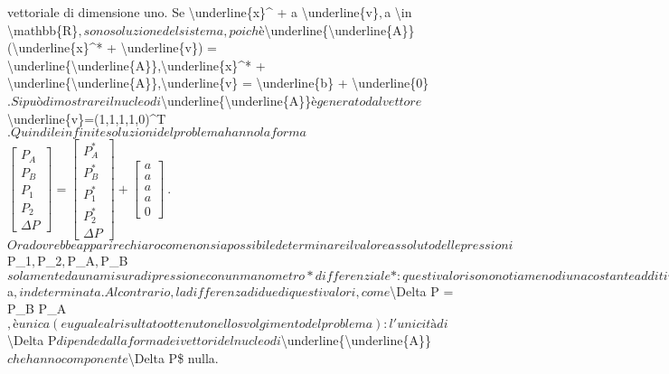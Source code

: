 \documentclass[letterpaper,10pt,italian]{jupyterBook}
\begin{document}
vettoriale di dimensione uno. Se \)\textbackslash{}underline\{x\}\textasciicircum{} + a \textbackslash{}underline\{v\}\(, \)a \textbackslash{}in \textbackslash{}mathbb\{R\}\(, sono soluzione
del sistema, poichè
\)\textbackslash{}underline\{\textbackslash{}underline\{A\}\}(\textbackslash{}underline\{x\}\textasciicircum{}* + \textbackslash{}underline\{v\}) = \textbackslash{}underline\{\textbackslash{}underline\{A\}\},\textbackslash{}underline\{x\}\textasciicircum{}* + \textbackslash{}underline\{\textbackslash{}underline\{A\}\},\textbackslash{}underline\{v\} = \textbackslash{}underline\{b\} + \textbackslash{}underline\{0\}\(.
Si può dimostrare il nucleo di \)\textbackslash{}underline\{\textbackslash{}underline\{A\}\}\( è generato
dal vettore \)\textbackslash{}underline\{v\}=(1,1,1,1,0)\textasciicircum{}T\(. Quindi le infinite soluzioni
del problema hanno la forma \)\(\begin{bmatrix}
  P_A \\ P_B \\ P_1 \\ P_2 \\ \Delta P 
 \end{bmatrix} = 
 \begin{bmatrix}
  P_A^* \\ P_B^* \\ P_1^* \\ P_2^* \\ \Delta P 
 \end{bmatrix} + 
 \begin{bmatrix}
   a \\ a \\ a \\ a \\ 0
 \end{bmatrix} \ .\)\( Ora dovrebbe apparire chiaro come non sia possibile
determinare il valore assoluto delle pressioni \)P\_1\(, \)P\_2\(, \)P\_A\(,
\)P\_B\( solamente da una misura di pressione con un manometro
*differenziale*: questi valori sono noti a meno di una costante additiva
\)a\(, indeterminata. Al contrario, la differenza di due di questi valori,
come \)\textbackslash{}Delta P = P\_B \sphinxhyphen{} P\_A\(, è unica (e uguale al risultato ottenuto
nello svolgimento del problema): l'unicità di \)\textbackslash{}Delta P\( dipende dalla
forma dei vettori del nucleo di \)\textbackslash{}underline\{\textbackslash{}underline\{A\}\}\( che hanno
componente \)\textbackslash{}Delta P\$ nulla.
\end{document}
